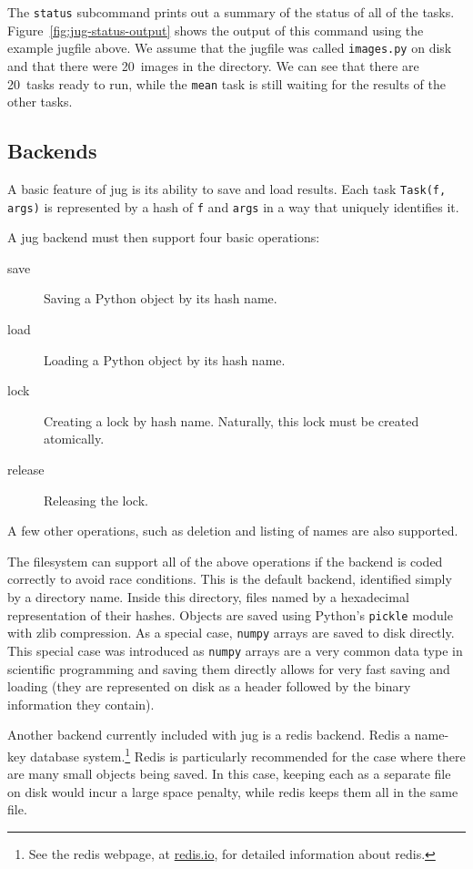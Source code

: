 \documentclass{article}
\let\code\texttt
\begin{document}
The \texttt{status} subcommand prints out a summary of the status of all of the
tasks. Figure~\ref{fig:jug-status-output} shows the output of this command
using the example jugfile above. We assume that the jugfile was called
\code{images.py} on disk and that there were 20~images in the directory. We can
see that there are 20~tasks ready to run, while the \code{mean} task is still
waiting for the results of the other tasks.

\subsection{Backends}

A basic feature of jug is its ability to save and load results. Each task
\code{Task(f, args)} is represented by a hash of \code{f} and \code{args} in a
way that uniquely identifies it.

A jug backend must then support four basic operations:

\begin{description}
\item[save] Saving a Python object by its hash name.
\item[load] Loading a Python object by its hash name.
\item[lock] Creating a lock by hash name. Naturally, this lock must be created
atomically.
\item[release] Releasing the lock.
\end{description}

A few other operations, such as deletion and listing of names are also
supported.

The filesystem can support all of the above operations if the backend is coded
correctly to avoid race conditions. This is the default backend, identified
simply by a directory name. Inside this directory, files named by a hexadecimal
representation of their hashes. Objects are saved using Python's \code{pickle}
module with zlib compression. As a special case, \code{numpy} arrays
\citep{numpy} are saved to disk directly. This special case was introduced as
\code{numpy} arrays are a very common data type in scientific programming and
saving them directly allows for very fast saving and loading (they are
represented on disk as a header followed by the binary information they
contain).

Another backend currently included with jug is a redis backend. Redis a
name-key database system.\footnote{See the redis webpage, at
\href{http://redis.io}{redis.io}, for detailed information about redis.} Redis
is particularly recommended for the case where there are many small objects
being saved. In this case, keeping each as a separate file on disk would incur
a large space penalty, while redis keeps them all in the same file.
\end{document}
